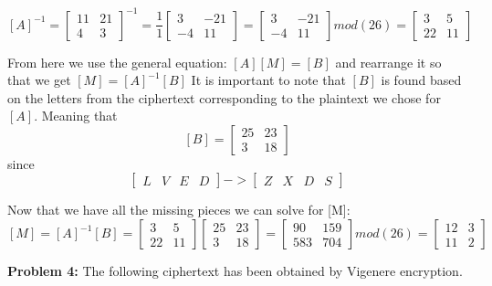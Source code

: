 \documentclass[12pt,letterpaper,final]{report}
\begin{document}
\bigskip \[[A]^{-1} =  \begin{bmatrix} 11 &21 \\ 4 & 3  \end{bmatrix}^{-1} = \frac{1}{1 }\begin{bmatrix} 3 &-21 \\ -4 &11  \end{bmatrix} = \begin{bmatrix} 3 &-21 \\ -4 &11  \end{bmatrix} mod (26) = \begin{bmatrix} 3 &5 \\ 22 &11  \end{bmatrix}\]

\bigskip From here we use the general equation: $[A][M] = [B]$ and rearrange it so that we get $[M] = [A]^{-1}[B]$
\bigskip It is important to note that $[B]$ is found based on the letters from the ciphertext corresponding to the plaintext we chose for $[A]$. Meaning that  \[[B] =  \begin{bmatrix} 25 &23 \\ 3 & 18  \end{bmatrix}\] since \[\begin{bmatrix}L & V & E &D \end{bmatrix} -> \begin{bmatrix}Z & X &D &S \end{bmatrix}\]

\bigskip Now that we have all the missing pieces we can solve for [M]:
\[[M] = [A]^{-1}[B] =  \begin{bmatrix} 3 &5 \\ 22 & 11  \end{bmatrix}\begin{bmatrix} 25 &23 \\ 3 & 18 \end{bmatrix} = \begin{bmatrix} 90&159 \\ 583 &704  \end{bmatrix} mod (26) = \begin{bmatrix} 12 &3 \\ 11 &2  \end{bmatrix}\]



\bigskip
\noindent\textbf{Problem 4:} The following ciphertext has been obtained by Vigenere encryption.\\\\
\end{document}
